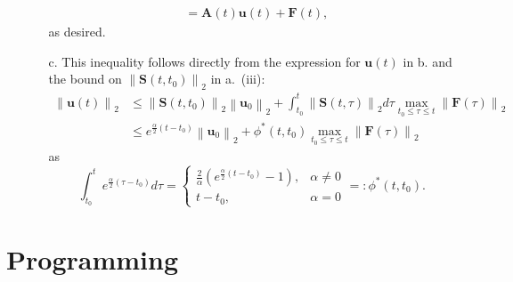 \documentclass{article}
\begin{document}
\begin{itemize}
\begin{itemize}
\begin{align*}
& = \mathbf{A}(t) \mathbf{u}(t) + \mathbf{F}(t), 
\end{align*}
as desired.
\item[c.] This inequality follows directly from the expression for $\mathbf{u}(t)$ in {b.} and the bound on $\left\lVert \mathbf{S} \left( t, t_0 \right) \right\rVert_2$ in {a.~(iii)}:
\begin{align*}
\left\lVert \mathbf{u}(t) \right\rVert_2
& \leq \left\lVert \mathbf{S} \left( t, t_0 \right) \right\rVert_2 \left\lVert \mathbf{u}_0 \right\rVert_2 + \int_{t_0}^t \left\lVert \mathbf{S}(t,\tau) \right\rVert_2 d\tau \max_{t_0 \leq \tau \leq t} \left\lVert \mathbf{F}(\tau) \right\rVert_2 \\
& \leq e^{\frac{\alpha}{2} \left( t - t_0 \right)} \left\lVert \mathbf{u}_0 \right\rVert_2 + \phi^* \left( t, t_0 \right) \max_{t_0 \leq \tau \leq t} \left\lVert \mathbf{F}(\tau) \right\rVert_2
\end{align*}
as
\begin{equation*}
\int_{t_0}^t e^{\frac{\alpha}{2} \left( \tau - t_0 \right)} d\tau = \begin{cases} \frac{2}{\alpha} \left( e^{\frac{\alpha}{2} \left( t - t_0 \right)} - 1 \right), & \alpha \neq 0 \\ t - t_0, & \alpha = 0 \end{cases} =: \phi^* \left( t, t_0 \right).
\end{equation*}
\end{itemize}

\end{itemize}

\section{Programming}
\end{document}
